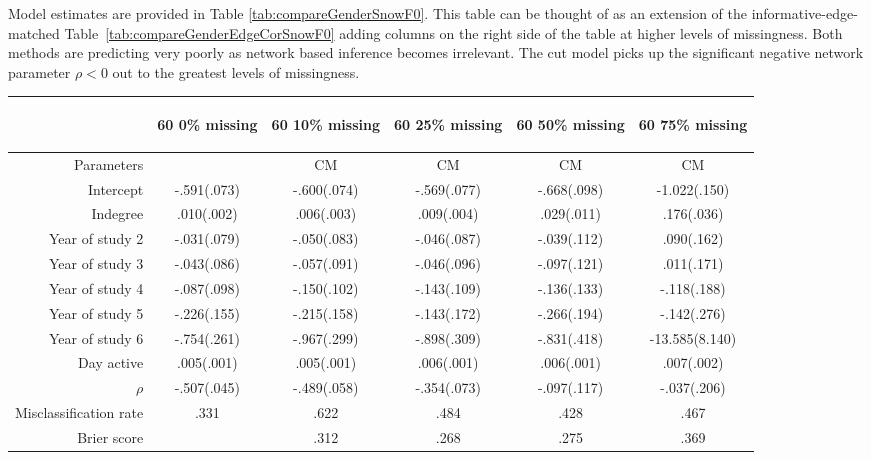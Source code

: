\documentclass{article}
\begin{document}
Model estimates are provided in Table \ref{tab:compareGenderSnowF0}. This table can be thought of as an extension of the informative-edge-matched Table~\ref{tab:compareGenderEdgeCorSnowF0} adding columns on the right side of the table at higher levels of missingness. Both methods
are predicting very poorly as network based inference becomes irrelevant. The cut model picks up the significant negative 
network parameter $\rho<0$ out to the greatest levels of missingness.

\begin{sidewaystable}
	\caption{Comparison of parameter estimates for \textit{Gender} under a cut and full Bayes imputation model with snowball/MAR sampling based missingness.}
	\label{tab:compareGenderSnowF0}
	\begin{center}
		\bigskip
		\bigskip
		\bigskip
		
		\begin{tabular}{r|ccccc}
			&
			\begin{rotate}{60} 0\% missing \end{rotate} &
			\begin{rotate}{60} 10\% missing \end{rotate}&
			\begin{rotate}{60} 25\% missing \end{rotate}&
			\begin{rotate}{60} 50\% missing \end{rotate}&
			\begin{rotate}{60} 75\% missing \end{rotate} \\ \hline
			Parameters	   & 			& CM 		 & CM	  	 & CM	 	 & CM 		  \\ \hline
			Intercept 	   &-.591(.073)	&-.600(.074) &-.569(.077)&-.668(.098)&-1.022(.150)\\
			Indegree	   & .010(.002)	& .006(.003) & .009(.004)& .029(.011)&  .176(.036)\\
			Year of study 2&-.031(.079)	&-.050(.083) &-.046(.087)&-.039(.112)&  .090(.162)\\
			Year of study 3&-.043(.086)	&-.057(.091) &-.046(.096)&-.097(.121)&  .011(.171)\\
			Year of study 4&-.087(.098)	&-.150(.102) &-.143(.109)&-.136(.133)& -.118(.188)\\
			Year of study 5&-.226(.155)	&-.215(.158) &-.143(.172)&-.266(.194)& -.142(.276)\\
			Year of study 6&-.754(.261)	&-.967(.299) &-.898(.309)&-.831(.418)&-13.585(8.140)\\	
			Day active 	   & .005(.001)	& .005(.001) & .006(.001)& .006(.001)&  .007(.002)\\
			$\rho$ 		   &-.507(.045)	&-.489(.058) &-.354(.073)&-.097(.117)& -.037(.206)\\
			Misclassification rate & 	.331    & .622  	 & .484	   	 & .428  	 &  .467 	  \\
			Brier score     & 	        & .312  	 & .268	   	 & .275  	 &  .369 	  \\ \hline
			

\end{tabular}
\end{center}
\end{sidewaystable}
\end{document}
